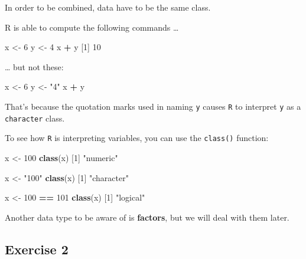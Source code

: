 \documentclass[
]{book}
\newenvironment{Shaded}{\begin{snugshade}}{\end{snugshade}}
\newcommand{\DecValTok}[1]{\textcolor[rgb]{0.00,0.00,0.81}{#1}}
\newcommand{\KeywordTok}[1]{\textcolor[rgb]{0.13,0.29,0.53}{\textbf{#1}}}
\newcommand{\NormalTok}[1]{#1}
\newcommand{\OperatorTok}[1]{\textcolor[rgb]{0.81,0.36,0.00}{\textbf{#1}}}
\newcommand{\StringTok}[1]{\textcolor[rgb]{0.31,0.60,0.02}{#1}}
\begin{document}
In order to be combined, data have to be the same class.

R is able to compute the following commands \ldots{}

\begin{Shaded}
\begin{Highlighting}[]
\NormalTok{x <-}\StringTok{ }\DecValTok{6}
\NormalTok{y <-}\StringTok{ }\DecValTok{4}
\NormalTok{x }\OperatorTok{+}\StringTok{ }\NormalTok{y}
\NormalTok{[}\DecValTok{1}\NormalTok{] }\DecValTok{10}
\end{Highlighting}
\end{Shaded}

\ldots{} but not these:

\begin{Shaded}
\begin{Highlighting}[]
\NormalTok{x <-}\StringTok{ }\DecValTok{6}
\NormalTok{y <-}\StringTok{ "4"}
\NormalTok{x }\OperatorTok{+}\StringTok{ }\NormalTok{y}
\end{Highlighting}
\end{Shaded}

That's because the quotation marks used in naming \texttt{y} causes \texttt{R} to interpret \texttt{y} as a \texttt{character} class.

To see how \texttt{R} is interpreting variables, you can use the \texttt{class()} function:

\begin{Shaded}
\begin{Highlighting}[]
\NormalTok{x <-}\StringTok{ }\DecValTok{100}
\KeywordTok{class}\NormalTok{(x)}
\NormalTok{[}\DecValTok{1}\NormalTok{] }\StringTok{"numeric"}

\NormalTok{x <-}\StringTok{ "100"}
\KeywordTok{class}\NormalTok{(x)}
\NormalTok{[}\DecValTok{1}\NormalTok{] }\StringTok{"character"}

\NormalTok{x <-}\StringTok{ }\DecValTok{100} \OperatorTok{==}\StringTok{ }\DecValTok{101}
\KeywordTok{class}\NormalTok{(x)}
\NormalTok{[}\DecValTok{1}\NormalTok{] }\StringTok{"logical"}
\end{Highlighting}
\end{Shaded}

Another data type to be aware of is \textbf{factors}, but we will deal with them later.

\hypertarget{exercise-2-1}{%
\subsection*{Exercise 2}\label{exercise-2-1}}
\end{document}
